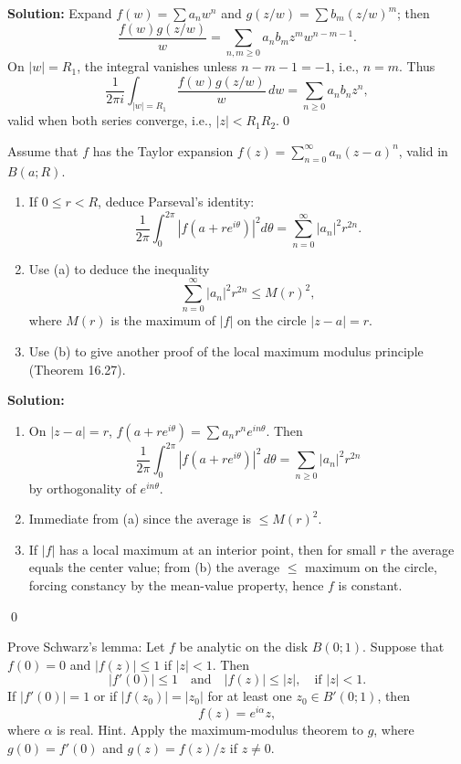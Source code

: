 \noindent\textbf{Solution:}
Expand $f(w)=\sum a_n w^n$ and $g(z/w)=\sum b_m (z/w)^m$; then
\[\frac{f(w)g(z/w)}{w}=\sum_{n,m\ge0} a_n b_m z^m w^{n-m-1}.\]
On $|w|=R_1$, the integral vanishes unless $n-m-1=-1$, i.e., $n=m$. Thus
\[\frac{1}{2\pi i}\int_{|w|=R_1}\frac{f(w)g(z/w)}{w}\,dw=\sum_{n\ge0} a_n b_n z^n,\]
valid when both series converge, i.e., $|z|<R_1R_2$.\qed


\begin{problembox}
Assume that \( f \) has the Taylor expansion \( f(z) = \sum_{n=0}^{\infty} a_n (z - a)^n \), valid in \( B(a; R) \).
\begin{enumerate}[label=(\alph*)]
\item If \( 0 \leq r < R \), deduce Parseval's identity:
\[ \frac{1}{2\pi} \int_0^{2\pi} |f(a + r e^{i\theta})|^2 d\theta = \sum_{n=0}^{\infty} |a_n|^2 r^{2n}. \]
\item Use (a) to deduce the inequality
\[ \sum_{n=0}^{\infty} |a_n|^2 r^{2n} \leq M(r)^2, \]
where \( M(r) \) is the maximum of \( |f| \) on the circle \( |z - a| = r \).
\item Use (b) to give another proof of the local maximum modulus principle (Theorem 16.27).
\end{enumerate}
\end{problembox}

\noindent\textbf{Solution:}
\begin{enumerate}[label=(\alph*)]
\item On $|z-a|=r$, $f(a+re^{i\theta})=\sum a_n r^n e^{in\theta}$. Then
\[\frac{1}{2\pi}\int_0^{2\pi}|f(a+re^{i\theta})|^2\,d\theta=\sum_{n\ge0}|a_n|^2 r^{2n}\]
by orthogonality of $e^{in\theta}$.
\item Immediate from (a) since the average is $\le M(r)^2$.
\item If $|f|$ has a local maximum at an interior point, then for small $r$ the average equals the center value; from (b) the average $\le$ maximum on the circle, forcing constancy by the mean-value property, hence $f$ is constant.
\end{enumerate}\qed


\begin{problembox}
Prove Schwarz's lemma: Let \( f \) be analytic on the disk \( B(0; 1) \). Suppose that \( f(0) = 0 \) and \( |f(z)| \leq 1 \) if \( |z| < 1 \). Then
\[ |f'(0)| \leq 1 \quad \text{and} \quad |f(z)| \leq |z|, \quad \text{if } |z| < 1. \]
If \( |f'(0)| = 1 \) or if \( |f(z_0)| = |z_0| \) for at least one \( z_0 \in B'(0; 1) \), then
\[ f(z) = e^{i\alpha} z, \]
where \( \alpha \) is real. Hint. Apply the maximum-modulus theorem to \( g \), where \( g(0) = f'(0) \) and \( g(z) = f(z)/z \) if \( z \neq 0 \).
\end{problembox}


